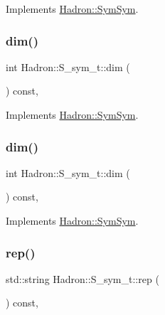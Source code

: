 Implements \mbox{\hyperlink{structHadron_1_1SymSym_ae57780f41b9f6c03c6056eed3677bd48}{Hadron\+::\+Sym\+Sym}}.

\mbox{\label{structHadron_1_1S__sym__t_ae8b1558dc91f46f5d78de03f1e587dc0}} 
\subsubsection{\texorpdfstring{dim()}{dim()}\hspace{0.1cm}{\footnotesize\ttfamily [2/3]}}
{\footnotesize\ttfamily int Hadron\+::\+S\+\_\+sym\+\_\+t\+::dim (\begin{DoxyParamCaption}{ }\end{DoxyParamCaption}) const\hspace{0.3cm}{\ttfamily [inline]}, {\ttfamily [virtual]}}



Implements \mbox{\hyperlink{structHadron_1_1SymSym_ae57780f41b9f6c03c6056eed3677bd48}{Hadron\+::\+Sym\+Sym}}.

\mbox{\label{structHadron_1_1S__sym__t_ae8b1558dc91f46f5d78de03f1e587dc0}} 
\subsubsection{\texorpdfstring{dim()}{dim()}\hspace{0.1cm}{\footnotesize\ttfamily [3/3]}}
{\footnotesize\ttfamily int Hadron\+::\+S\+\_\+sym\+\_\+t\+::dim (\begin{DoxyParamCaption}{ }\end{DoxyParamCaption}) const\hspace{0.3cm}{\ttfamily [inline]}, {\ttfamily [virtual]}}



Implements \mbox{\hyperlink{structHadron_1_1SymSym_ae57780f41b9f6c03c6056eed3677bd48}{Hadron\+::\+Sym\+Sym}}.

\mbox{\label{structHadron_1_1S__sym__t_a1a8ccb60f6d70c9a00b8683ad8eac195}} 
\subsubsection{\texorpdfstring{rep()}{rep()}\hspace{0.1cm}{\footnotesize\ttfamily [1/3]}}
{\footnotesize\ttfamily std\+::string Hadron\+::\+S\+\_\+sym\+\_\+t\+::rep (\begin{DoxyParamCaption}{ }\end{DoxyParamCaption}) const\hspace{0.3cm}{\ttfamily [inline]}, {\ttfamily [virtual]}}



